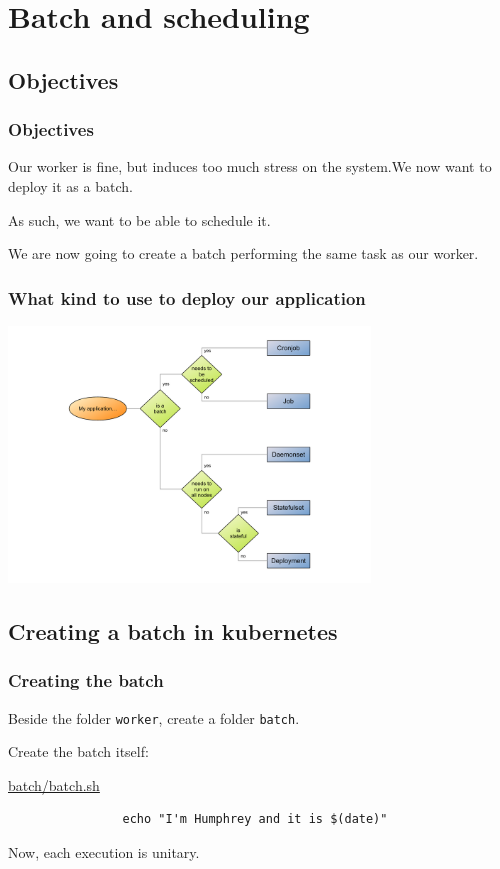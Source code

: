 \section{Batch and scheduling}

\subsection{Objectives}

	\begin{frame}
		\frametitle{Objectives}
		
		Our worker is fine, but induces too much stress on the system.We now want to deploy it as a batch.
		
		\bigskip
		As such, we want to be able to schedule it.
		
		\bigskip
		We are now going to create a batch performing the same task as our worker.
	\end{frame}

	\begin{frame}
		\frametitle{What kind to use to deploy our application}
		
		\begin{center}
		\includegraphics[height=6.8cm]{../../../resources/color/choiceDeploymentType.pdf}
		\end{center}
	\end{frame}
		
\subsection{Creating a batch in kubernetes}		
		
	\begin{frame}[fragile]
		\frametitle{Creating the batch}
		
		Beside the folder \verb!worker!, create a folder \verb!batch!.
		
		\bigskip
		Create the batch itself:
		\begin{block}{\href{https://github.com/Tinkou/trainings/blob/master/trainings/sources/dev-onboarding/files/batch/batch.sh}{batch/batch.sh}}
			\begin{verbatim}
				echo "I'm Humphrey and it is $(date)"
			\end{verbatim}
		\end{block}
		Now, each execution is unitary.
	\end{frame}
	
